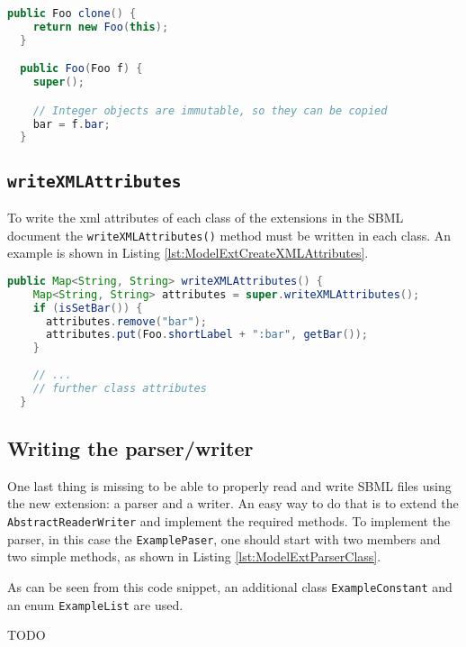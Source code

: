 \begin{lstlisting}[language=Java,caption={Example of the \texttt{clone} method for the \texttt{Foo} class},label={lst:ModelExtCloneFoo}]
  public Foo clone() {
    return new Foo(this);
  }

  public Foo(Foo f) {
    super();

    // Integer objects are immutable, so they can be copied
    bar = f.bar;
  }
\end{lstlisting}

\subsection{\texttt{writeXMLAttributes}}
To write the xml attributes of each class of the extensions in the SBML document the \texttt{writeXMLAttributes()} method must be written in each class.
An example is shown in Listing \ref{lst:ModelExtCreateXMLAttributes}.

\begin{lstlisting}[language=Java,caption={Method to create the XML attributes},label={lst:ModelExtCreateXMLAttributes}]
  public Map<String, String> writeXMLAttributes() {
    Map<String, String> attributes = super.writeXMLAttributes();
    if (isSetBar()) {
      attributes.remove("bar");
      attributes.put(Foo.shortLabel + ":bar", getBar());
    }
    
    // ...
    // further class attributes
  }
\end{lstlisting}


\subsection{Writing the parser/writer}

One last thing is missing to be able to properly read and write SBML files using the new extension: a parser and a writer.
An easy way to do that is to extend the \texttt{AbstractReaderWriter} and implement the required methods.
To implement the parser, in this case the \texttt{ExamplePaser}, one should start with two members and two simple methods, as shown in Listing \ref{lst:ModelExtParserClass}.

As can be seen from this code snippet, an additional class \texttt{ExampleConstant} and an enum \texttt{ExampleList} are used.

TODO


